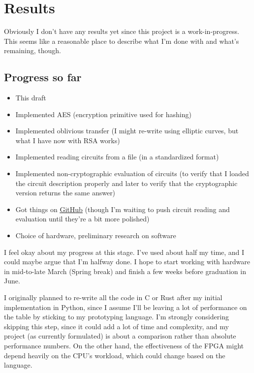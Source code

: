 \documentclass[letterpaper]{article}
\begin{document}
\section{Results}
{\color{red}
Obviously I don't have any results yet since this project is a work-in-progress. This seems like a reasonable place to describe what I'm done with and what's remaining, though.

\subsection{Progress so far}

\begin{itemize}
	\item This draft
	\item Implemented AES (encryption primitive used for hashing)
	\item Implemented oblivious transfer (I might re-write using elliptic curves, but what I have now with RSA works)
	\item Implemented reading circuits from a file (in a standardized format)
	\item Implemented non-cryptographic evaluation of circuits (to verify that I loaded the circuit description properly and later to verify that the cryptographic version returns the same answer)
	\item Got things on \href{https://github.com/gabrielkulp/undergrad-thesis}{\underline{GitHub}} (though I'm waiting to push circuit reading and evaluation until they're a bit more polished)
	\item Choice of hardware, preliminary research on software
\end{itemize}

I feel okay about my progress at this stage. I've used about half my time, and I could maybe argue that I'm halfway done. I hope to start working with hardware in mid-to-late March (Spring break) and finish a few weeks before graduation in June.

I originally planned to re-write all the code in C or Rust after my initial implementation in Python, since I assume I'll be leaving a lot of performance on the table by sticking to my prototyping language. I'm strongly considering skipping this step, since it could add a lot of time and complexity, and my project (as currently formulated) is about a comparison rather than absolute performance numbers. On the other hand, the effectiveness of the FPGA might depend heavily on the CPU's workload, which could change based on the language.

}
\end{document}
